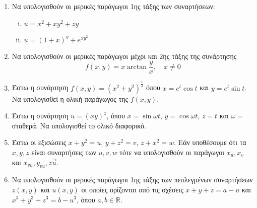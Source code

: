 


\usepackage{qtree}
\usepackage{xcolor}


\everymath{\displaystyle}



\begin{center}
\end{center}

\vspace{\baselineskip}

\begin{enumerate}

	\item Να υπολογισθούν οι μερικές παράγωγοι 1ης τάξης των συναρτήσεων: 

		\begin{enumerate}[(i)]
			\item $ u = x^{2} + xy^{2} + zy $ 
			\item $ u = (1+x)^{y} + e^{xy^{2}} $
		\end{enumerate}


	\item Να υπολογισθούν οι μερικές παράγωγοι μέχρι και 2ης τάξης της συνάρτησης 
		\[
			f(x,y) = x\arctan{\frac{ y }{ x }}, \quad x\neq 0
		\] 

	\item Έστω η συνάρτηση $ f(x,y) = (x^{2} + y^{2})^{\frac{1}{ 2 }} $ όπου $ x = e^{t}
		\cos{t} $ και $ y = e^{t} \sin{t} $. Να υπολογισθεί η ολική παράγωγος της $ f(x,y) $.

	\item Έστω η συνάρτηση $ u = (xy)^{z}  $, όπου $ x = \sin{\omega t} $, $ y = \cos{\omega t} $, $
		z = t $ και $ \omega = $ σταθερά. Να υπολογισθεί το ολικό διαφορικό. 

	\item Έστω οι εξισώσεις $ x + y^{2} = u $, $ y + z^{2} = v $, $ z + x^{2} = w $. Εάν υποθέσουμε
		ότι τα $ x,y,z $ είναι συναρτήσεις των $ u,v,w $ τότε να υπολογισθούν οι παράγωγοι $ x_{u},
		x_{v} $ και $ x_{vu}, y_{vu}, z{\vec{u}} $.

	\item Να υπολογισθούν οι μερικές παράγωγοι 1ης τάξης των πεπλεγμένων συναρτήσεων $ z(x,y) $ και
		$ u(x,y) $ οι οποίες ορίζονται από τις σχέσεις $ x + y + z = a - u $ και $ x^{3} + y^{3} +
		z^{3} = b - u^{3} $, όπου $ a,b \in \mathbb{R} $.


\end{enumerate}
